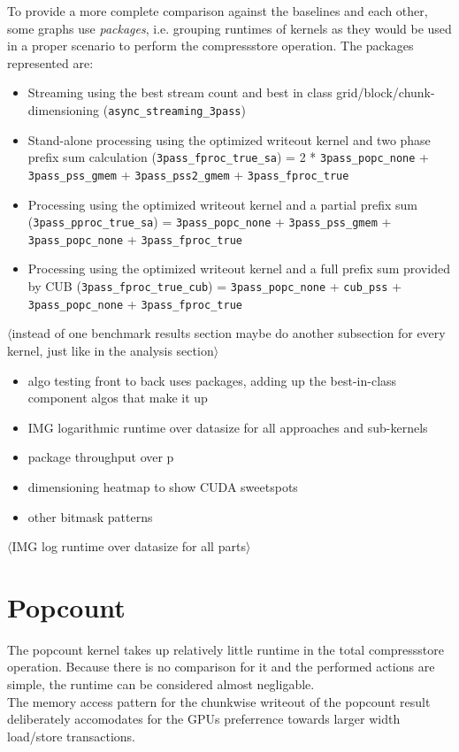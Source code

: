 \documentclass{tudscrreprt}
\newcommand{\markr}[1]{\textcolor{review}{$\langle$#1$\rangle$}}
\begin{document}
			To provide a more complete comparison against the baselines and each other, some graphs use \emph{packages}, i.e. grouping runtimes of kernels as they would be used in a proper scenario to perform the compressstore operation. The packages represented are:
			\begin{itemize}
				\item Streaming using the best stream count and best in class grid/block/chunk-dimensioning (\texttt{async\_streaming\_3pass})
				\item Stand-alone processing using the optimized writeout kernel and two phase prefix sum calculation (\texttt{3pass\_fproc\_true\_sa})
					\subitem = 2 * \texttt{3pass\_popc\_none} + \texttt{3pass\_pss\_gmem} + \texttt{3pass\_pss2\_gmem} + \texttt{3pass\_fproc\_true}
				\item Processing using the optimized writeout kernel and a partial prefix sum (\texttt{3pass\_pproc\_true\_sa})
					\subitem = \texttt{3pass\_popc\_none} + \texttt{3pass\_pss\_gmem} + \texttt{3pass\_popc\_none} + \texttt{3pass\_fproc\_true}
				\item Processing using the optimized writeout kernel and a full prefix sum provided by CUB (\texttt{3pass\_fproc\_true\_cub})
					\subitem = \texttt{3pass\_popc\_none} + \texttt{cub\_pss} + \texttt{3pass\_popc\_none} + \texttt{3pass\_fproc\_true}
			\end{itemize}
		
		\markr{instead of one benchmark results section maybe do another subsection for every kernel, just like in the analysis section}
		\begin{itemize}
			\item algo testing front to back uses packages, adding up the best-in-class component algos that make it up
			\item IMG logarithmic runtime over datasize for all approaches and sub-kernels
			\item package throughput over p
			\item dimensioning heatmap to show CUDA sweetspots
			\item other bitmask patterns
		\end{itemize}
	
		\markr{IMG log runtime over datasize for all parts} \\
	
		\section{Popcount}
			The popcount kernel takes up relatively little runtime in the total compressstore operation. Because there is no comparison for it and the performed actions are simple, the runtime can be considered almost negligable. \\
			The memory access pattern for the chunkwise writeout of the popcount result deliberately accomodates for the GPUs preferrence towards larger width load/store transactions. \\
			
\end{document}
